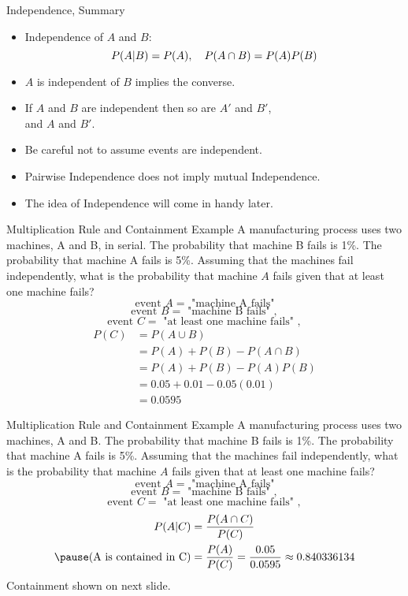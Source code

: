 \documentclass[handout]{beamer}
\begin{document}
\begin{frame}{Independence, Summary}
    \begin{itemize}
        \item Independence of $A$ and $B$:
        $$P(A|B) = P(A), \hskip 1em P(A \cap B) = P(A)P(B)$$
        \item $A$ is independent of $B$ implies the converse.
        \item If $A$ and $B$ are independent then so are $A'$ and $B'$,\\ and $A$ and $B'$.
        \item Be careful not to assume events are independent.
        \item Pairwise Independence does not imply mutual Independence.
        \item The idea of Independence will come in handy later.
    \end{itemize}
\end{frame}

\begin{frame}{Multiplication Rule and Containment Example}
    A manufacturing process uses two machines, A and B, in serial. The probability that machine B fails is 1\%. The probability that machine A fails is 5\%. Assuming that the machines fail independently, what is the probability that machine $A$ fails given that at least one machine fails?
    \pause $$\text{event } A = \text{ "machine A fails"}$$ 
    $$\text{event } B = \text{ "machine B fails" }, $$
    $$\text{event } C = \text{ "at least one machine fails" }, $$
    \pause 
    \begin{align*}
        P(C) &= P(A \cup B) \\
        &= P(A) + P(B) - P(A\cap B) \\
        &= P(A) + P(B) - P(A)P(B) \\
        & = 0.05 + 0.01 - 0.05(0.01) \\
        & = 0.0595
    \end{align*}
\end{frame}

\begin{frame}{Multiplication Rule and Containment Example}
    A manufacturing process uses two machines, A and B. The probability that machine B fails is 1\%. The probability that machine A fails is 5\%. Assuming that the machines fail independently, what is the probability that machine $A$ fails given that at least one machine fails?
    \pause $$\text{event } A = \text{ "machine A fails"}$$ 
    $$\text{event } B = \text{ "machine B fails" }, $$
    $$\text{event } C = \text{ "at least one machine fails" }, $$
    \pause 
    \begin{align*}
        P(A|C) &= \frac{P(A\cap C)}{P(C)} \\
        \pause (\text{A is contained in C}) &= \frac{P(A)}{P(C)} = \frac{0.05}{0.0595} \approx 0.840336134
    \end{align*}
    Containment shown on next slide.
\end{frame}
\end{document}
